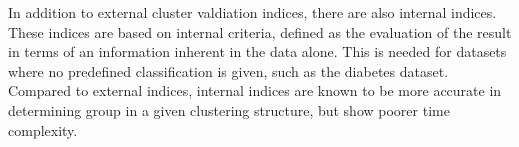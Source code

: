 In addition to external cluster valdiation indices, there are also internal indices. These indices are based on internal criteria, defined as the evaluation of the result in terms of an information inherent in the data alone. This is needed for datasets where no predefined classification is given, such as the diabetes dataset. Compared to external indices, internal indices are known to be more accurate in determining group in a given clustering structure, but show poorer time complexity. \cite{int_ext}